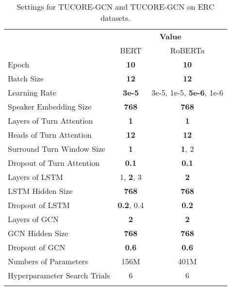 \documentclass[11pt]{article}
\begin{document}
\begin{table}
\centering
{\scriptsize
\begin{tabular}{l|c|c}
\Xhline{3\arrayrulewidth}
\multirow{2}{*}{\textbf{Hyperparameter}} & \multicolumn{2}{c}{\textbf{Value}}\\\cline{2-3}
& BERT & RoBERTa\\
\Xhline{3\arrayrulewidth}
Epoch & \textbf{10} & \textbf{10} \\ 
Batch Size & \textbf{12} & \textbf{12} \\
Learning Rate & \textbf{3e-5} & 3e-5, 1e-5, \textbf{5e-6}, 1e-6 \\
Speaker Embedding Size & \textbf{768} & \textbf{768} \\
Layers of Turn Attention & \textbf{1} & \textbf{1} \\
Heads of Turn Attention & \textbf{12} & \textbf{12} \\
Surround Turn Window Size & \textbf{1} & \textbf{1}, 2 \\
Dropout of Turn Attention & \textbf{0.1} & \textbf{0.1} \\
Layers of LSTM & 1, \textbf{2}, 3 & \textbf{2} \\
LSTM Hidden Size & \textbf{768} & \textbf{768} \\
Dropout of LSTM & \textbf{0.2}, 0.4 & \textbf{0.2} \\
Layers of GCN & \textbf{2} & \textbf{2} \\
GCN Hidden Size & \textbf{768} & \textbf{768} \\
Dropout of GCN & \textbf{0.6} & \textbf{0.6} \\
\hline
\hline
Numbers of Parameters & 156M & 401M \\
Hyperparameter Search Trials & 6 & 6 \\
\Xhline{3\arrayrulewidth}
\end{tabular}
}
\caption{\label{Setting_ERC}Settings for TUCORE-GCN and TUCORE-GCN on ERC datasets.}
\end{table}
\end{document}
